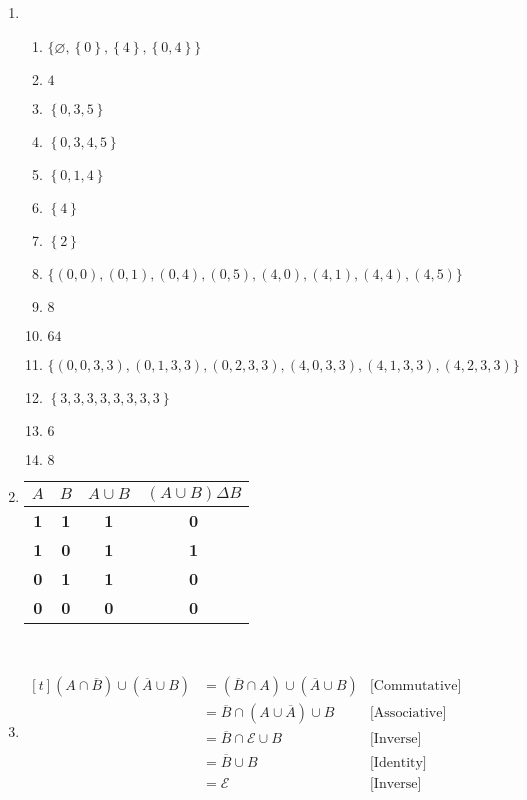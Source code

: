 \begin{enumerate}[leftmargin=2cm,labelsep=.5cm,label=\bf\arabic*.]
\item
\begin{enumerate}
  \item $\big\{\varnothing,\left\{0\right\},\left\{4\right\},\left\{0,4\right\} \big\}$
  \item $4$
  \item $\left\{0,3,5 \right\}$
  \item $\left\{0,3,4,5 \right\}$
  \item $\left\{0,1,4 \right\}$
  \item $\left\{4 \right\}$
  \item $\left\{2 \right\}$
  \item $\big\{\left(0,0\right),\left(0,1\right),\left(0,4\right),\left(0,5\right),\left(4,0\right),\left(4,1\right),\left(4,4\right),\left(4,5\right) \big\}$
  \item $8$
  \item $64$
  \item $\big\{\left(0,0,3,3\right),\left(0,1,3,3\right),\left(0,2,3,3\right),\left(4,0,3,3\right),\left(4,1,3,3\right),\left(4,2,3,3\right) \big\}$
  \item $\left\{3,3,3,3,3,3,3,3 \right\}$
  \item $6$
  \item $8$\\[5mm]
\end{enumerate}

\item
\begin{tabu}[t]{|c|c|c|c|}
\hline
$A$ & $B$ & $A\cup B$ & $(A\cup B)\Delta B$ \\ \hline
\textbf{1} & \textbf{1} & \textbf{1} & \textbf{0} \\ \hline
\textbf{1} & \textbf{0} & \textbf{1} & \textbf{1} \\ \hline
\textbf{0} & \textbf{1} & \textbf{1} & \textbf{0} \\ \hline
\textbf{0} & \textbf{0} & \textbf{0} & \textbf{0} \\ \hline
\end{tabu}\\[5mm]

\item $
\begin{aligned}[t]
(A \cap \overline{B}) \cup (\overline{A} \cup B) &= (\overline{B} \cap A) \cup (\overline{A} \cup B) & \text{[Commutative]}\\
&= \overline{B} \cap (A \cup \overline{A}) \cup B & \text{[Associative]}\\
&= \overline{B} \cap \mathscr{E} \cup B & \text{[Inverse]}\\
&= \overline{B} \cup B & \text{[Identity]}\\
&= \mathscr{E} & \text{[Inverse]}
\end{aligned} $
\end{enumerate}
